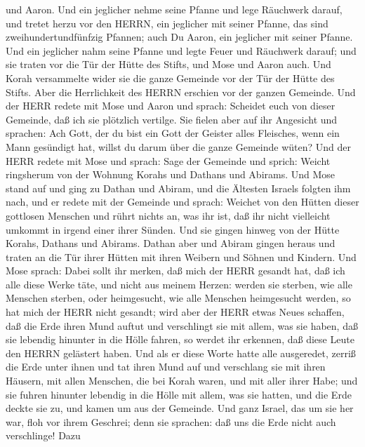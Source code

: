 und Aaron.  Und ein jeglicher nehme seine Pfanne und lege
Räuchwerk darauf, und tretet herzu vor den HERRN, ein jeglicher mit
seiner Pfanne, das sind zweihundertundfünfzig Pfannen; auch Du Aaron,
ein jeglicher mit seiner Pfanne.  Und ein jeglicher nahm
seine Pfanne und legte Feuer und Räuchwerk darauf; und sie traten vor
die Tür der Hütte des Stifts, und Mose und Aaron auch.  Und
Korah versammelte wider sie die ganze Gemeinde vor der Tür der Hütte des
Stifts. Aber die Herrlichkeit des HERRN erschien vor der ganzen
Gemeinde.  Und der HERR redete mit Mose und Aaron und
sprach:  Scheidet euch von dieser Gemeinde, daß ich sie
plötzlich vertilge.  Sie fielen aber auf ihr Angesicht und
sprachen: Ach Gott, der du bist ein Gott der Geister alles Fleisches,
wenn ein Mann gesündigt hat, willst du darum über die ganze Gemeinde
wüten?  Und der HERR redete mit Mose und sprach:
 Sage der Gemeinde und sprich: Weicht ringsherum von der
Wohnung Korahs und Dathans und Abirams.  Und Mose stand auf
und ging zu Dathan und Abiram, und die Ältesten Israels folgten ihm
nach,  und er redete mit der Gemeinde und sprach: Weichet
von den Hütten dieser gottlosen Menschen und rührt nichts an, was ihr
ist, daß ihr nicht vielleicht umkommt in irgend einer ihrer Sünden.
 Und sie gingen hinweg von der Hütte Korahs, Dathans und
Abirams. Dathan aber und Abiram gingen heraus und traten an die Tür
ihrer Hütten mit ihren Weibern und Söhnen und Kindern.  Und
Mose sprach: Dabei sollt ihr merken, daß mich der HERR gesandt hat, daß
ich alle diese Werke täte, und nicht aus meinem Herzen: 
werden sie sterben, wie alle Menschen sterben, oder heimgesucht, wie
alle Menschen heimgesucht werden, so hat mich der HERR nicht gesandt;
 wird aber der HERR etwas Neues schaffen, daß die Erde
ihren Mund auftut und verschlingt sie mit allem, was sie haben, daß sie
lebendig hinunter in die Hölle fahren, so werdet ihr erkennen, daß diese
Leute den HERRN gelästert haben.  Und als er diese Worte
hatte alle ausgeredet, zerriß die Erde unter ihnen  und tat
ihren Mund auf und verschlang sie mit ihren Häusern, mit allen Menschen,
die bei Korah waren, und mit aller ihrer Habe;  und sie
fuhren hinunter lebendig in die Hölle mit allem, was sie hatten, und die
Erde deckte sie zu, und kamen um aus der Gemeinde.  Und
ganz Israel, das um sie her war, floh vor ihrem Geschrei; denn sie
sprachen: daß uns die Erde nicht auch verschlinge!  Dazu
